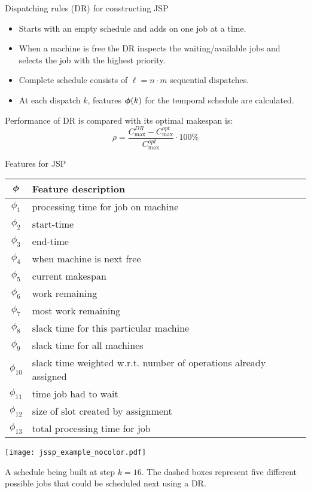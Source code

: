 \documentclass[xcolor=pdftex,t,11pt,handout]{beamer}
\begin{document}
{\framebreak
\begin{block}{Dispatching rules (DR) for constructing JSP}
\begin{itemize}
	\item Starts with an empty schedule and adds on one job at a time. 
	\item When a machine is free the DR inspects the waiting/available jobs and selects the job with the \alert{highest priority}. 
	\item Complete schedule consists of $\ell=n\cdot m$ sequential dispatches.
	\item At each dispatch $k$, \alert{features} ${\boldsymbol{\phi}}(k)$ for the temporal schedule are calculated.
\end{itemize}
\end{block}
Performance of DR is compared with its optimal makespan is: 
$$\rho=\frac{C_{\max}^{DR}-C_{\max}^{opt}}{C_{\max}^{opt}}\cdot 100\%$$
\framebreak
\begin{block}{Features for JSP}\label{tbl:features}
\begin{table}[t!]
 {\scriptsize
 \begin{center}
  \begin{tabular}{|c|l|}
   \hline\hline
  ${\boldsymbol{\phi}}$ & Feature description \\ \hline
  $\phi_1$ & processing time for job on machine\\
  $\phi_2$ & start-time \\
  $\phi_3$ & end-time \\
  $\phi_4$ & when machine is next free \\
  $\phi_5$ & current makespan \\
  $\phi_6$ & work remaining \\
  $\phi_7$ & most work remaining \\
  $\phi_8$ & slack time for this particular machine \\
  $\phi_9$ & slack time for all machines \\
  $\phi_{10}$ & slack time weighted w.r.t. number of operations already assigned \\
  $\phi_{11}$ & time job had to wait\\
  $\phi_{12}$ & size of slot created by assignment \\
  $\phi_{13}$ & total processing time for job \\
 \hline\hline
  \end{tabular}
 \end{center}}
\end{table}
\end{block}

\framebreak
\begin{example}
	\begin{center}
		\texttt{[image: jssp\_example\_nocolor.pdf]}
	\end{center}
	A schedule being built at step $k=16$. The dashed boxes represent five different possible jobs that could be scheduled next using a DR.
\end{example}
}
\end{document}
